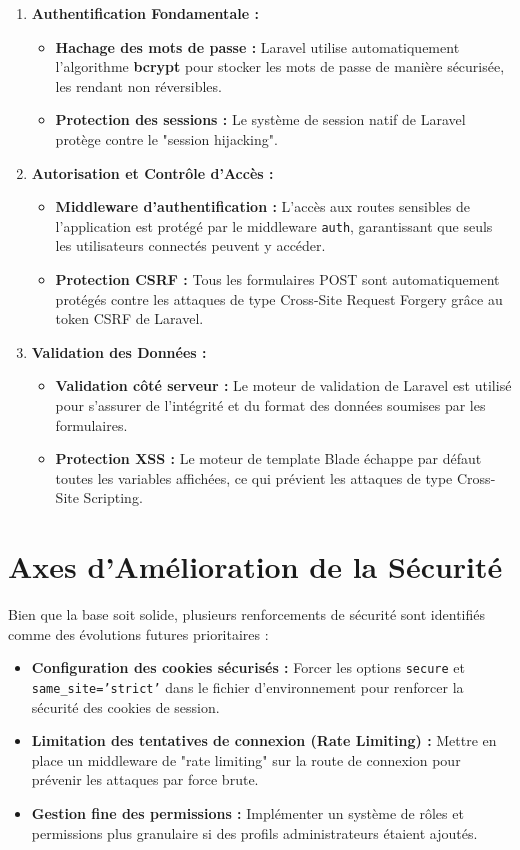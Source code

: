 \documentclass[12pt,a4paper]{report}
\begin{document}
\begin{enumerate}
    \item \textbf{Authentification Fondamentale :}
    \begin{itemize}
        \item \textbf{Hachage des mots de passe :} Laravel utilise automatiquement l'algorithme \textbf{bcrypt} pour stocker les mots de passe de manière sécurisée, les rendant non réversibles.
        \item \textbf{Protection des sessions :} Le système de session natif de Laravel protège contre le "session hijacking".
    \end{itemize}

    \item \textbf{Autorisation et Contrôle d'Accès :}
    \begin{itemize}
        \item \textbf{Middleware d'authentification :} L'accès aux routes sensibles de l'application est protégé par le middleware \texttt{auth}, garantissant que seuls les utilisateurs connectés peuvent y accéder.
        \item \textbf{Protection CSRF :} Tous les formulaires POST sont automatiquement protégés contre les attaques de type Cross-Site Request Forgery grâce au token CSRF de Laravel.
    \end{itemize}

    \item \textbf{Validation des Données :}
    \begin{itemize}
        \item \textbf{Validation côté serveur :} Le moteur de validation de Laravel est utilisé pour s'assurer de l'intégrité et du format des données soumises par les formulaires.
        \item \textbf{Protection XSS :} Le moteur de template Blade échappe par défaut toutes les variables affichées, ce qui prévient les attaques de type Cross-Site Scripting.
    \end{itemize}
\end{enumerate}

\section{Axes d'Amélioration de la Sécurité}

Bien que la base soit solide, plusieurs renforcements de sécurité sont identifiés comme des évolutions futures prioritaires :
\begin{itemize}
    \item \textbf{Configuration des cookies sécurisés :} Forcer les options \texttt{secure} et \texttt{same\_site='strict'} dans le fichier d'environnement pour renforcer la sécurité des cookies de session.
    \item \textbf{Limitation des tentatives de connexion (Rate Limiting) :} Mettre en place un middleware de "rate limiting" sur la route de connexion pour prévenir les attaques par force brute.
    \item \textbf{Gestion fine des permissions :} Implémenter un système de rôles et permissions plus granulaire si des profils administrateurs étaient ajoutés.
\end{itemize}
\end{document}
